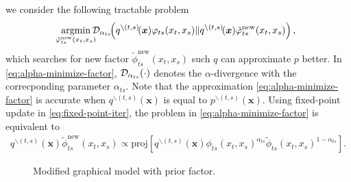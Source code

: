 we consider the following tractable problem
\begin{equation}\label{eq:alpha-minimize-factor}
  \!\!\!\uargmin{\tilde{\phi}_{ts}^{\mathrm{new}}(x_t, x_s)}\!\!\!\!
  \Dd_{\alpha_{ts}}\!\!\left( q^{\backslash (t,s)}\!(\bm{x}){\phi}_{ts}(x_t, x_s)
    \|q^{\backslash (t,s)}\!(\bm{x})\tilde{\phi}_{ts}^{\mathrm{new}}(x_t, x_s) \right),
\end{equation}
which searches for new factor $\tilde{\phi}_{ts}^{\mathrm{new}}(x_t, x_s)$ such $q$ can approximate $p$ better. In \eqref{eq:alpha-minimize-factor}, $\mathcal{D}_{\alpha_{ts}}(\cdot)$ denotes the $\alpha$-divergence with the correcponding parameter $\alpha_{ts}$. Note that the approximation \eqref{eq:alpha-minimize-factor} is accurate when $q^{\backslash (t,s)}(\bm{x})$ is equal to $p^{\backslash (t,s)}(\bm{x})$. 
Using fixed-point update in \eqref{eq:fixed-point-iter}, the problem in \eqref{eq:alpha-minimize-factor} is equivalent to
\begin{align}\label{eq:update-rule}
  q^{\backslash (t,s)}(\bm{x})\tilde{\phi}_{ts}^{\mathrm{new}}(x_t, x_s) \propto
    \mathrm{proj}\left[ q^{\backslash
        (t,s)}(\bm{x}){\phi}_{ts}(x_t, x_s)^{\alpha_{ts}} \tilde{\phi}_{ts}(x_t, x_s)^{1-\alpha_{ts}} \right]. 
\end{align}
\begin{figure}[!t]
  \begin{centering}
    \caption{Modified graphical model with prior factor.}\label{fig:factor-graph-with-prior}
  \end{centering}
\end{figure}

